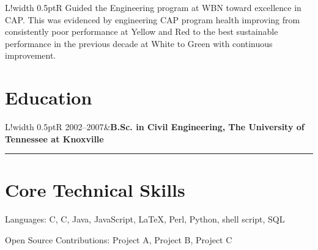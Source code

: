 \documentclass[10pt,letterpaper]{article}
\newcommand\VRule{\color{lightgray}\vrule width 0.5pt}
\newenvironment{indentsection}[1]%
{\begin{list}{}%
	{\setlength{\leftmargin}{#1}}%
	\item[]%
}
{\end{list}}
\newcommand{\CPP}
{C\nolinebreak[4]\hspace{-.05em}\raisebox{.22ex}{\footnotesize\bf ++}}
\begin{document}
\begin{tabular}{L!{\VRule}R}
Guided the Engineering program at WBN toward excellence in CAP.  This was evidenced by engineering CAP program health improving from consistently poor performance at Yellow and Red to the best sustainable performance in the previous decade at White to Green with continuous improvement.\\
\end{tabular}

\section*{Education}
\begin{tabular}{L!{\VRule}R}
2002--2007&{\bf B.Sc. in Civil Engineering, The University of Tennessee at Knoxville}\\[5pt]
\end{tabular}

\hrule
\vspace{-0.4em}
\section*{Core Technical Skills}

\begin{indentsection}{\parindent}
\begin{description*}
	\item[Languages:]
	C, \CPP, Java, JavaScript, \LaTeX, Perl, Python, shell script, SQL
	\item[Open Source Contributions:]
	Project A, Project B, Project C
\end{description*}
\end{indentsection}
\end{document}
